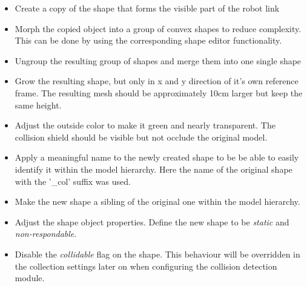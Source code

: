 \begin{itemize}

\item
Create a copy of the shape that forms the visible part of the robot link
\item
Morph the copied object into a group of convex shapes to reduce complexity. This can be done by using the corresponding shape editor functionality.
\item
Ungroup the resulting group of shapes and merge them into one single shape
\item
Grow the resulting shape, but only in x and y direction of it's own reference frame. The resulting mesh should be approximately 10cm larger but keep the same height.
\item
Adjust the outside color to make it green and nearly transparent. The collision shield should be visible but not occlude the original model.
\item
Apply a meaningful name to the newly created shape to be be able to easily identify it within the model hierarchy. Here the name of the original shape with the '\_col' suffix was used.
\item
Make the new shape a sibling of the original one within the model hierarchy.
\item
Adjust the shape object properties. Define the new shape to be \emph{static} and \emph{non-respondable}.
\item
Disable the \emph{collidable} flag on the shape. This behaviour will be overridden in the collection
settings later on when configuring the collision detection module.

\end{itemize}

